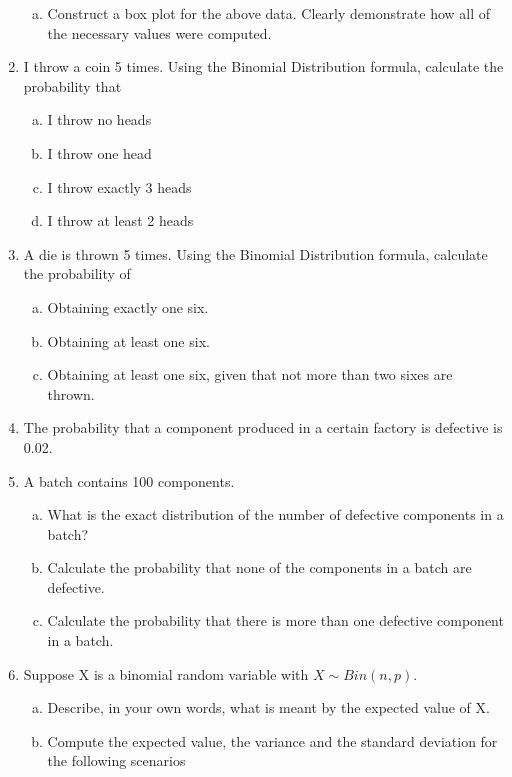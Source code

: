 \documentclass[a4paper,12pt]{article}
\begin{document}
\begin{enumerate}
\begin{enumerate}[(a)]
\item Construct a box plot for the above data. Clearly demonstrate how all of the necessary values were computed.
\end{enumerate}



\item
I throw a coin 5 times.  Using the Binomial Distribution formula, calculate the probability that
\begin{multicols}{2}
\begin{enumerate}[(a)]
\item  I throw no heads
\item  I throw one head
\item  I throw exactly 3 heads
\item  I throw at least 2 heads
\end{enumerate}
\end{multicols}
\newpage
\item 
A die is thrown 5 times. Using the Binomial Distribution formula, calculate the probability of
\begin{enumerate}[(a)]
\item  Obtaining exactly one six.
\item  Obtaining at least one six.
\item  Obtaining at least one six, given that not more than two sixes are thrown.
\end{enumerate}

\item
The probability that a component produced in a certain factory is defective is 0.02. \item  A batch contains 100
components.
\begin{enumerate}[(a)]
\item  What is the exact distribution of the number of defective components in a batch?
\item  Calculate the probability that none of the components in a batch are defective.
\item  Calculate the probability that there is more than one defective component in a batch.
\end{enumerate}

\item
Suppose X is a binomial random variable with
$X \sim Bin(n, p)$.
\begin{enumerate}[(a)]
\item  Describe, in your own words, what is meant by the expected value of X.
\item  Compute the expected value, the variance and the standard deviation for the following scenarios


\end{enumerate}
\end{enumerate}
\end{document}
